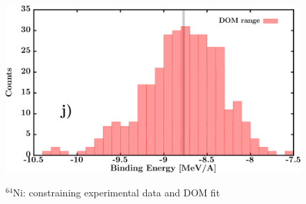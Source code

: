 \documentclass[twocolumn,secnumarabic,amssymb, nobibnotes, aps, prl,
superscriptaddress, nobalancelastpage, draft]{revtex4}
\newcommand{\niFour}{\ensuremath{^{64}}N\lowercase{i}}
\begin{document}
\begin{figure}[!htb]
\begin{minipage}{0.4\linewidth}
        \label{DOM_ni64_RMSRadius}
    \end{minipage}\hspace{6pt}
    \begin{minipage}{0.4\linewidth}
        \centering
        \includegraphics[width=\linewidth]{figures/ni64_BE.png}
        \label{DOM_ni64_BE}
    \end{minipage}
    \caption{\niFour: constraining experimental data and DOM fit}
    \label{DOM_ni64_structural}
\end{figure}
\end{document}
